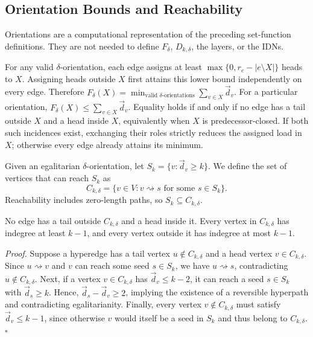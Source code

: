 \documentclass[twocolumn]{svjour3}
\begin{document}
\subsection{Orientation Bounds and Reachability}
Orientations are a computational representation of the preceding set-function definitions. They are not needed to define $F_\delta$, $D_{k,\delta}$, the layers, or the IDNs.

For any valid $\delta$-orientation, each edge assigns at least $\max\{0,r_e-|e\setminus X|\}$ heads to $X$. Assigning heads outside $X$ first attains this lower bound independently on every edge. Therefore
 $F_\delta(X)=\min_{\text{valid }\delta\text{-orientations}}
                  \sum_{v\in X}\vec d_v$.
For a particular orientation, $F_\delta(X)\le\sum_{v\in X}\vec d_v$. Equality holds if and only if no edge has a tail outside $X$ and a head inside $X$, equivalently when $X$ is predecessor-closed. If both such incidences exist, exchanging their roles strictly reduces the assigned load in $X$; otherwise every edge already attains its minimum.

Given an egalitarian $\delta$-orientation, let $S_k=\{v:\vec d_v\ge k\}$. We define the set of vertices that can reach $S_k$ as
\[
C_{k,\delta}=\{v\in V:v\rightsquigarrow s
\text{ for some }s\in S_k\}.
\]
Reachability includes zero-length paths, so $S_k\subseteq C_{k,\delta}$.

\begin{lemma}\label{degree}
No edge has a tail outside $C_{k,\delta}$ and a head inside it. Every vertex in $C_{k,\delta}$ has indegree at least $k-1$, and every vertex outside it has indegree at most $k-1$.
\end{lemma}
\emph{Proof.}
Suppose a hyperedge has a tail vertex $u\notin C_{k,\delta}$ and a head vertex $v\in C_{k,\delta}$. Since $u\rightsquigarrow v$ and $v$ can reach some seed $s\in S_k$, we have $u\rightsquigarrow s$, contradicting $u\notin C_{k,\delta}$.
Next, if a vertex $v\in C_{k,\delta}$ has $\vec d_v\le k-2$, it can reach a seed $s\in S_k$ with $\vec d_s\ge k$. Hence, $\vec d_s-\vec d_v\ge 2$, implying the existence of a reversible hyperpath and contradicting egalitarianity.
Finally, every vertex $v\notin C_{k,\delta}$ must satisfy $\vec d_v\le k-1$, since otherwise $v$ would itself be a seed in $S_k$ and thus belong to $C_{k,\delta}$. \hfill$\square$
\end{document}
